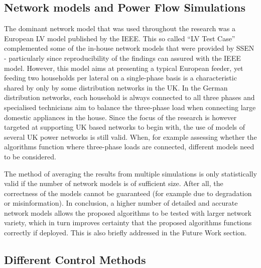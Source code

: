 \subsection{Network models and Power Flow Simulations}

The dominant network model that was used throughout the research was a European LV model published by the IEEE.
This so called ``LV Test Case'' complemented some of the in-house network models that were provided by SSEN - particularly since reproducibility of the findings can assured with the IEEE model.
However, this model aims at presenting a typical European feeder, yet feeding two households per lateral on a single-phase basis is a characteristic shared by only by some distribution networks in the UK.
In the German distribution networks, each household is always connected to all three phases and specialised technicians aim to balance the three-phase load when connecting large domestic appliances in the house.
Since the focus of the research is however targeted at supporting UK based networks to begin with, the use of models of several UK power networks is still valid.
When, for example assessing whether the algorithms function where three-phase loads are connected, different models need to be considered.

The method of averaging the results from multiple simulations is only statistically valid if the number of network models is of sufficient size.
After all, the correctness of the models cannot be guaranteed (for example due to degradation or misinformation).
In conclusion, a higher number of detailed and accurate network models allows the proposed algorithms to be tested with larger network variety, which in turn improves certainty that the proposed algorithms functions correctly if deployed.
This is also briefly addressed in the Future Work section.

\subsection{Different Control Methods}

